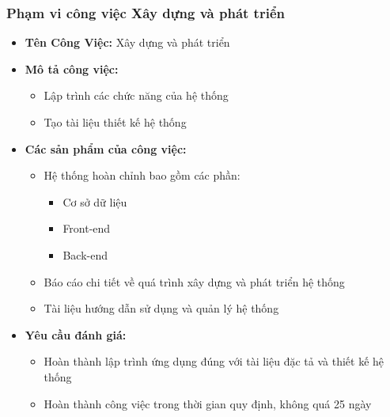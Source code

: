 \subsubsection{Phạm vi công việc Xây dựng và phát triển}
\begin{itemize}
    \item \textbf{Tên Công Việc:} Xây dựng và phát triển
    \item \textbf{Mô tả công việc:}
    \begin{itemize}
        \item Lập trình các chức năng của hệ thống
        \item Tạo tài liệu thiết kế hệ thống
    \end{itemize}
    \item \textbf{Các sản phẩm của công việc:}
    \begin{itemize}
        \item Hệ thống hoàn chỉnh bao gồm các phần:
        \begin{itemize}
            \item Cơ sở dữ liệu
            \item Front-end
            \item Back-end
        \end{itemize}
        \item Báo cáo chi tiết về quá trình xây dựng và phát triển hệ thống
        \item Tài liệu hướng dẫn sử dụng và quản lý hệ thống
    \end{itemize}
    \item \textbf{Yêu cầu đánh giá:}
    \begin{itemize}
        \item Hoàn thành lập trình ứng dụng đúng với tài liệu đặc tả và thiết kế hệ thống
        \item Hoàn thành công việc trong thời gian quy định, không quá 25 ngày
    \end{itemize}
\end{itemize}

